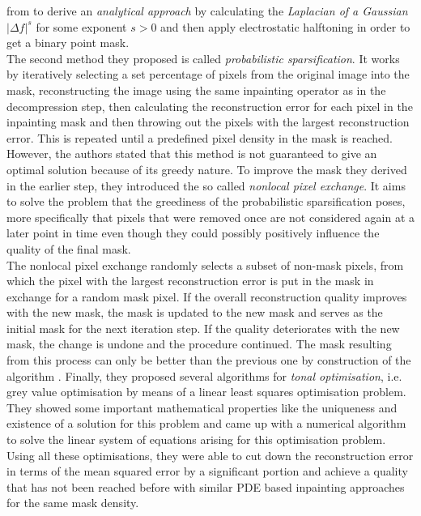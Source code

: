 from \cite{belhachmi09} to derive an \textit{analytical approach} by calculating the \textit{Laplacian of a
Gaussian} $\vert \Delta f \vert^s$ for some exponent $s>0$ and then apply electrostatic 
halftoning\cite{electrostatic} in order to get a binary point mask.\\
The second method they proposed is called \textit{probabilistic sparsification}. It works by
iteratively selecting a set percentage of pixels from the original image into the mask,
reconstructing the image using the same inpainting operator as in the decompression step, then
calculating the reconstruction error for each pixel in the inpainting mask and then throwing out
the pixels with the largest reconstruction error. This is repeated until a predefined pixel
density in the mask is reached. However, the authors stated that this method is not guaranteed to
give an optimal solution because of its greedy nature. To improve the mask they derived in the
earlier step, they introduced the so called \textit{nonlocal pixel exchange}. It aims to solve the
problem that the greediness of the probabilistic sparsification poses, more specifically that
pixels that were removed once are not considered again at a later point in time even though they
could possibly positively influence the quality of the final mask.\\
The nonlocal pixel exchange randomly selects a subset of non-mask pixels, from which the pixel with
the largest reconstruction error is put in the mask in exchange for a random mask pixel.
If the overall reconstruction quality improves with the new mask, the mask is updated to the new
mask and serves as the initial mask for the next iteration step. If the quality deteriorates with
the new mask, the change is undone and the procedure continued.
The mask resulting from this process can only be better than the previous one by construction of
the algorithm \cite{hoeltgen12}.
Finally, they proposed several algorithms for \textit{tonal optimisation}, i.e. grey value
optimisation by means of a linear least squares optimisation problem. They showed some important
mathematical properties like the uniqueness and existence of a solution for this problem and
came up with a numerical algorithm to solve the linear system of equations arising for this
optimisation problem.
Using all these optimisations, they were able to cut down the reconstruction error in terms of the
mean squared error by a significant portion and achieve a quality that has not been reached before 
with similar PDE based inpainting approaches for the same mask density.


